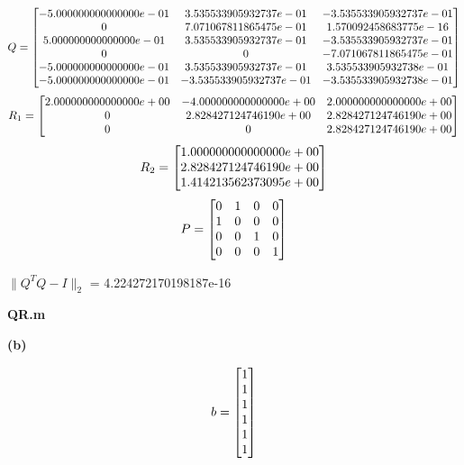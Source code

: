 \documentclass[final,12pt,reqno]{amsart}
\begin{document}
\[
Q =
\left[\begin{array}{@{}*{3}{c}@{}}
    -5.000000000000000e-01&     3.535533905932737e-01&    -3.535533905932737e-01\\
                         0&     7.071067811865475e-01&     1.570092458683775e-16\\
     5.000000000000000e-01&     3.535533905932737e-01&    -3.535533905932737e-01\\
                         0&                         0&    -7.071067811865475e-01\\
    -5.000000000000000e-01&     3.535533905932737e-01&     3.535533905932738e-01\\
    -5.000000000000000e-01&    -3.535533905932737e-01&    -3.535533905932738e-01
  \end{array} \right]
\]
\[
R_1 =
\left[\begin{array}{@{}*{3}{c}@{}}
     2.000000000000000e+00&    -4.000000000000000e+00&     2.000000000000000e+00\\
                         0&     2.828427124746190e+00&     2.828427124746190e+00\\
                         0&                         0&     2.828427124746190e+00
  \end{array} \right]
\]
\[
R_2 =
\left[\begin{array}{@{}*{1}{c}@{}}
     1.000000000000000e+00\\
     2.828427124746190e+00\\
     1.414213562373095e+00
  \end{array} \right]
\]
\[
P = 
\left[\begin{array}{@{}*{4}{c}@{}}
     0&     1&     0&     0\\
     1&     0&     0&     0\\
     0&     0&     1&     0\\
     0&     0&     0&     1
  \end{array} \right]
\]

$\|Q^TQ-I\|_2$ = 4.224272170198187e-16

\newpage

\textbf{QR.m}


\newpage

\textbf{(b)}

\[
b = 
\left[\begin{array}{@{}*{1}{c}@{}}
	1\\
	1\\
	1\\
	1\\
	1\\
	1
  \end{array} \right]
\]
\end{document}
